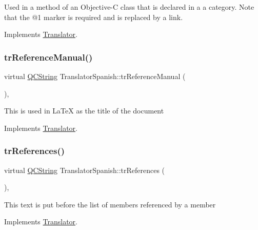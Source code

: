 Used in a method of an Objective-\/C class that is declared in a a category. Note that the @1 marker is required and is replaced by a link. 

Implements \mbox{\hyperlink{class_translator}{Translator}}.

\mbox{\label{class_translator_spanish_a2754c117cab433c5d4a7cd1c297904e7}} 
\subsubsection{\texorpdfstring{trReferenceManual()}{trReferenceManual()}}
{\footnotesize\ttfamily virtual \mbox{\hyperlink{class_q_c_string}{Q\+C\+String}} Translator\+Spanish\+::tr\+Reference\+Manual (\begin{DoxyParamCaption}{ }\end{DoxyParamCaption})\hspace{0.3cm}{\ttfamily [inline]}, {\ttfamily [virtual]}}

This is used in La\+TeX as the title of the document 

Implements \mbox{\hyperlink{class_translator}{Translator}}.

\mbox{\label{class_translator_spanish_aad1d8b8afbceb1a5de0a24977dfc50f8}} 
\subsubsection{\texorpdfstring{trReferences()}{trReferences()}}
{\footnotesize\ttfamily virtual \mbox{\hyperlink{class_q_c_string}{Q\+C\+String}} Translator\+Spanish\+::tr\+References (\begin{DoxyParamCaption}{ }\end{DoxyParamCaption})\hspace{0.3cm}{\ttfamily [inline]}, {\ttfamily [virtual]}}

This text is put before the list of members referenced by a member 

Implements \mbox{\hyperlink{class_translator}{Translator}}.

\mbox{\label{class_translator_spanish_ad66b855c99f7c62357a5b0ff558ce941}} 
